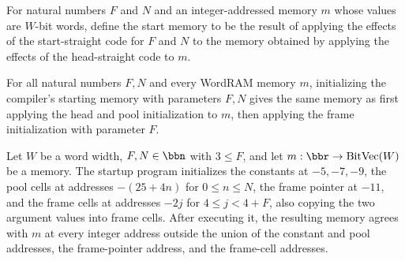\begin{definition}
\label{Light.Compiler.startMem}
\leanok
{}
For natural numbers $F$ and $N$ and an integer-addressed memory $m$ whose values are
$W$-bit words, define the start memory to be the result of applying the effects of the
start-straight code for $F$ and $N$ to the memory obtained by applying the effects of
the head-straight code to $m$.
\end{definition}

\begin{theorem}
\label{Light.Compiler.startMem_eq}
\leanok
{}
For all natural numbers $F,N$ and every WordRAM memory $m$, initializing the compiler's
starting memory with parameters $F,N$ gives the same memory as first applying the head
and pool initialization to $m$, then applying the frame initialization with parameter
$F$.
\end{theorem}

\begin{theorem}
\label{Light.Compiler.agreeOutside_startMem}
\leanok
{}
Let $W$ be a word width, $F,N\in\bbn$ with $3\le F$, and let $m:\bbr\to\text{BitVec}(W)$
be a memory. The startup program initializes the constants at $-5,-7,-9$, the pool cells
at addresses $-(25+4n)$ for $0\le n\le N$, the frame pointer at $-11$, and the frame
cells at addresses $-2j$ for $4\le j<4+F$, also copying the two argument values into
frame cells. After executing it, the resulting memory agrees with $m$ at every integer
address outside the union of the constant and pool addresses, the frame-pointer address,
and the frame-cell addresses.
\end{theorem}

